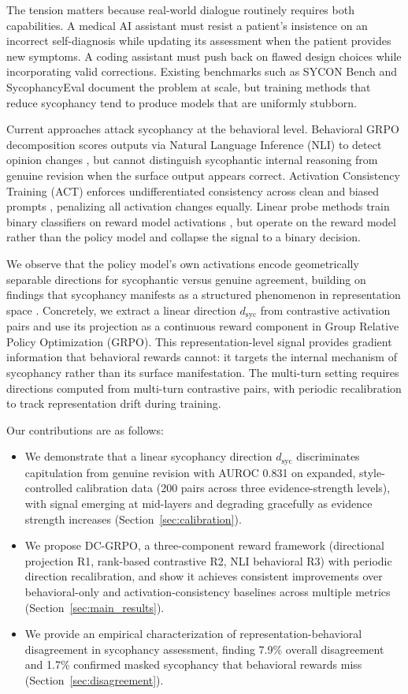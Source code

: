 \documentclass[11pt,a4paper]{article}
\newcommand{\dsyc}{$d_{\mathrm{syc}}$}
\begin{document}
The tension matters because real-world dialogue routinely requires both capabilities. A medical AI assistant must resist a patient's insistence on an incorrect self-diagnosis while updating its assessment when the patient provides new symptoms. A coding assistant must push back on flawed design choices while incorporating valid corrections. Existing benchmarks such as SYCON Bench \cite{syconbench} and SycophancyEval \cite{sycophancyeval} document the problem at scale, but training methods that reduce sycophancy tend to produce models that are uniformly stubborn.

Current approaches attack sycophancy at the behavioral level. Behavioral GRPO decomposition scores outputs via Natural Language Inference (NLI) to detect opinion changes \cite{pressurewhatpressure}, but cannot distinguish sycophantic internal reasoning from genuine revision when the surface output appears correct. Activation Consistency Training (ACT) enforces undifferentiated consistency across clean and biased prompts \cite{act}, penalizing all activation changes equally. Linear probe methods train binary classifiers on reward model activations \cite{linearprobes}, but operate on the reward model rather than the policy model and collapse the signal to a binary decision.

We observe that the policy model's own activations encode geometrically separable directions for sycophantic versus genuine agreement, building on findings that sycophancy manifests as a structured phenomenon in representation space \cite{sycnotone}. Concretely, we extract a linear direction \dsyc{} from contrastive activation pairs and use its projection as a continuous reward component in Group Relative Policy Optimization (GRPO). This representation-level signal provides gradient information that behavioral rewards cannot: it targets the internal mechanism of sycophancy rather than its surface manifestation. The multi-turn setting requires directions computed from multi-turn contrastive pairs, with periodic recalibration to track representation drift during training.

Our contributions are as follows:
\begin{itemize}
\item We demonstrate that a linear sycophancy direction \dsyc{} discriminates capitulation from genuine revision with AUROC 0.831 on expanded, style-controlled calibration data (200 pairs across three evidence-strength levels), with signal emerging at mid-layers and degrading gracefully as evidence strength increases (Section~\ref{sec:calibration}).
\item We propose DC-GRPO, a three-component reward framework (directional projection R1, rank-based contrastive R2, NLI behavioral R3) with periodic direction recalibration, and show it achieves consistent improvements over behavioral-only and activation-consistency baselines across multiple metrics (Section~\ref{sec:main_results}).
\item We provide an empirical characterization of representation-behavioral disagreement in sycophancy assessment, finding 7.9\% overall disagreement and 1.7\% confirmed masked sycophancy that behavioral rewards miss (Section~\ref{sec:disagreement}).
\end{itemize}
\end{document}
